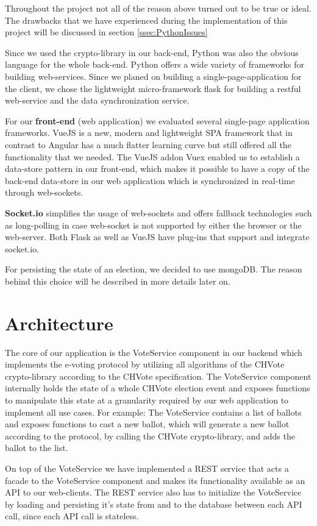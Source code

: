 Throughout the project not all of the reason above turned out to be true or ideal. The drawbacks that we have experienced during the implementation of this project will be discussed in section \ref{ssec:PythonIssues}

Since we used the crypto-library in our back-end, Python was also the obvious language for the whole back-end. Python offers a wide variety of frameworks for building web-services. Since we planed on building a single-page-application for the client, we chose the lightweight micro-framework flask for building a restful web-service and the data synchronization service. 

For our \textbf{front-end} (web application) we evaluated several single-page application frameworks. VueJS is a new, modern and lightweight SPA framework that in contrast to Angular has a much flatter learning curve but still offered all the functionality that we needed. The VueJS addon Vuex enabled us to establish a data-store pattern in our front-end, which makes it possible to have a copy of the back-end data-store in our web application which is synchronized in real-time through web-sockets.

\textbf{Socket.io} simplifies the usage of web-sockets and offers fallback technologies such as long-polling in case web-socket is not supported by either the browser or the web-server. Both Flask as well as VueJS have plug-ins that support and integrate socket.io.

For persisting the state of an election, we decided to use mongoDB. The reason behind this choice will be described in more details later on.

\section{Architecture}
The core of our application is the VoteService component in our backend which implements the e-voting protocol by utilizing all algorithms of the CHVote crypto-library according to the CHVote specification. The VoteService component internally holds the state of a whole CHVote election event and exposes functions to manipulate this state at a granularity required by our web application to implement all use cases. For example: The VoteService contains a list of ballots and exposes functions to cast a new ballot, which will generate a new ballot according to the protocol, by calling the CHVote crypto-library, and adds the ballot to the list.

On top of the VoteService we have implemented a REST service that acts a facade to the VoteService component and makes its functionality available as an API to our web-clients. The REST service also has to initialize the VoteService by loading and persisting it's state from and to the database between each API call, since each API call is stateless.

